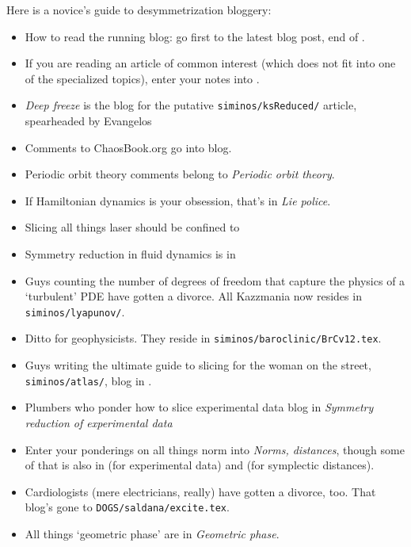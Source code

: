 Here is a novice's guide to desymmetrization bloggery:
\begin{itemize}
  \item
How to read the running blog: go first to the latest blog post, end
of .
  \item
If you are reading an article of common interest (which does not fit into
one of the specialized topics), enter your notes into .
  \item
{} \emph{Deep freeze} is the blog for the putative
\texttt{siminos/ksReduced/}
article, spearheaded by Evangelos
  \item
Comments to ChaosBook.org go into  blog.
  \item
Periodic orbit theory comments belong to  {\em
Periodic orbit theory}.
  \item
If Hamiltonian dynamics is your obsession, that's in
 {\em Lie police}.
  \item
Slicing all things laser should be confined to
  \item
Symmetry reduction in fluid dynamics is in 
  \item
Guys counting the number of degrees of freedom that capture the physics
of a `turbulent' PDE have gotten a divorce. All Kazzmania now resides in
\texttt{siminos/lyapunov/}.
  \item
Ditto for geophysicists. They reside in
\texttt{siminos/baroclinic/BrCv12.tex}.
  \item
Guys writing the ultimate guide to slicing for the woman on the street,
\texttt{siminos/atlas/}, blog in .
  \item
Plumbers who ponder how to slice experimental data blog in
 {\em Symmetry reduction of experimental data}
  \item
Enter your ponderings on all things norm into 
\emph{Norms, distances}, though some of that is also in 
(for experimental data) and  (for symplectic
distances).
  \item
Cardiologists (mere electricians, really) have gotten a divorce, too. That
blog's gone to \texttt{DOGS/saldana/excite.tex}.
  \item
All things `{geometric phase}' are in  {\em
Geometric phase}.

\end{itemize}






